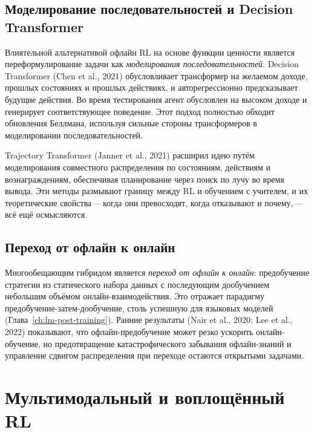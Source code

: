 \subsection{Моделирование последовательностей и Decision Transformer}

Влиятельной альтернативой офлайн RL на основе функции ценности является
переформулирование задачи как \emph{моделирования последовательностей}. Decision
Transformer (Chen et al., 2021) обусловливает трансформер на желаемом
доходе, прошлых состояниях и прошлых действиях, и авторегрессионно
предсказывает будущие действия. Во время тестирования агент обусловлен на
высоком доходе и генерирует соответствующее поведение. Этот подход
полностью обходит обновления Беллмана, используя сильные стороны трансформеров
в моделировании последовательностей.

Trajectory Transformer (Janner et al., 2021) расширил идею путём
моделирования совместного распределения по состояниям, действиям и вознаграждениям,
обеспечивая планирование через поиск по лучу во время вывода. Эти методы размывают
границу между RL и обучением с учителем, и их теоретические
свойства\,---\,когда они превосходят, когда отказывают и почему,\,---\,
всё ещё осмысляются.

\subsection{Переход от офлайн к онлайн}

Многообещающим гибридом является \emph{переход от офлайн к онлайн}: предобучение стратегии
из статического набора данных с последующим дообучением небольшим объёмом
онлайн-взаимодействия. Это отражает парадигму предобучение-затем-дообучение, столь
успешную для языковых моделей
(Глава~\ref{ch:lm-post-training}). Ранние результаты (Nair et al.,
2020; Lee et al., 2022) показывают, что офлайн-предобучение может
резко ускорить онлайн-обучение, но предотвращение катастрофического
забывания офлайн-знаний и управление сдвигом распределения
при переходе остаются открытыми задачами.


\section{Мультимодальный и воплощённый RL}
\label{sec:open-embodied}

